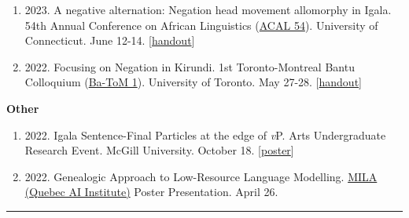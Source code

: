 \documentclass[margin,line]{resume}
\begin{document}
\begin{resume}
\begin{enumerate}[-, leftmargin=1em, topsep=2pt]
		\item[] {2023. A negative alternation: Negation head movement allomorphy in Igala. 54th Annual Conference on African Linguistics (\href{https://uconnuecs.cventevents.com/event/aef2d257-6a6a-41b5-b83d-2c6efc60aac5/summary}{ACAL 54}). University of Connecticut. June 12-14. [\href{run:../handouts/chaperon_ACAL54_Igala_Negation-handout.pdf}{handout}]}
		
		\item[] {2022. Focusing on Negation in Kirundi. 1st Toronto-Montreal Bantu Colloquium (\href{https://mcling.blogs.mcgill.ca/2022/05/24/mcgill-at-ba-tom-1/}{Ba-ToM 1}). University of Toronto. May 27-28. [\href{run:../handouts/chaperon_batom_kirundi_negn-handout.pdf}{handout}]}
	\end{enumerate}
	
\begin{comment}
	\textbf{Reading Group \& Labs}
	\begin{enumerate}[-, leftmargin=1em, topsep=2pt]
		\item[] {2023. \href{https://mcling.blogs.mcgill.ca/2023/01/15/mull-lab-1-17-brandon-chaperon/}{A negative alternation: Negation head movement allomorphy in Igala}. \href{https://mull-lab.org/}{MULL Lab} meeting. McGill University. January 17.}

		\item[] {2022. \href{https://mcling.blogs.mcgill.ca/2022/03/27/mull-lab-03-30-brandon-chaperon/}{Igala's Dual Negation}. \href{https://mull-lab.org/}{MULL Lab} meeting. McGill University. March 30.}
	\end{enumerate}
\end{comment}

	\textbf{Other}
	\begin{enumerate}[-, leftmargin=1em, topsep=2pt]
		\item[] {2022. Igala Sentence-Final Particles at the edge of \textit{v}P. Arts Undergraduate Research Event. McGill University. October 18. [\href{https://www.mcgill.ca/arts-internships/files/arts-internships/brandon_chaperon.pdf}{poster}]}

		\item[] {2022. Genealogic Approach to Low-Resource Language Modelling. \href{https://mila.quebec/en/}{MILA (Quebec AI Institute)} Poster Presentation. April 26.}

	\end{enumerate}


	\vspace{-0.9em}\rule{\textwidth}{0.4pt}


\end{resume}
\end{document}
